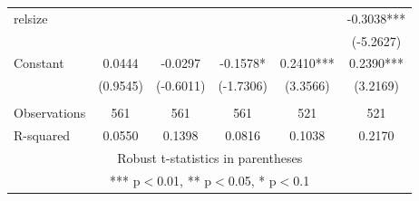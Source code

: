 \documentclass[12pt]{article}
\begin{document}
\begin{adjustbox}{max width=\textwidth}
\begin{tabular}{lccccc}
   relsize &  &  &  &  & -0.3038*** \\
	&  &  &  &  & (-5.2627) \\
   Constant & 0.0444 & -0.0297 & -0.1578* & 0.2410*** & 0.2390*** \\
	& (0.9545) & (-0.6011) & (-1.7306) & (3.3566) & (3.2169) \\
	&  &  &  &  &  \\
   Observations & 561 & 561 & 561 & 521 & 521 \\
	R-squared & 0.0550 & 0.1398 & 0.0816 & 0.1038 & 0.2170 \\ \hline
   \multicolumn{6}{c}{ Robust t-statistics in parentheses} \\
   \multicolumn{6}{c}{ *** p$<$0.01, ** p$<$0.05, * p$<$0.1} \\
   \end{tabular}
\end{adjustbox}
\end{document}
